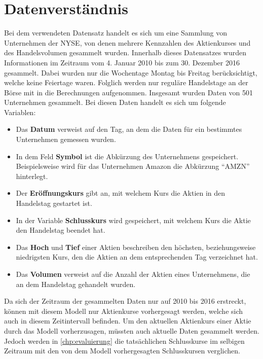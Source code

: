 \chapter{Datenverständnis}\label{chp:datenverstaendnis}
Bei dem verwendeten Datensatz handelt es sich um eine Sammlung von Unternehmen der \ac{NYSE}, von denen mehrere Kennzahlen des Aktienkurses und des Handelsvolumen gesammelt wurden. Innerhalb dieses Datensatzes wurden Informationen im Zeitraum vom 4. Januar 2010 bis zum 30. Dezember 2016 gesammelt. Dabei wurden nur die Wochentage Montag bis Freitag berücksichtigt, welche keine Feiertage waren. Folglich werden nur reguläre Handelstage an der Börse mit in die Berechnungen aufgenommen. Insgesamt wurden Daten von 501 Unternehmen gesammelt. Bei diesen Daten handelt es sich um folgende Variablen:

\begin{itemize}
    \item Das \textbf{Datum} verweist auf den Tag, an dem die Daten für ein bestimmtes Unternehmen gemessen wurden.
    \item In dem Feld \textbf{Symbol} ist die Abkürzung des Unternehmens gespeichert. Beispielsweise wird für das Unternehmen Amazon die Abkürzung ``AMZN'' hinterlegt.
    \item Der \textbf{Eröffnungskurs} gibt an, mit welchem Kurs die Aktien in den Handelstag gestartet ist.
    \item In der Variable \textbf{Schlusskurs} wird gespeichert, mit welchem Kurs die Aktie den Handelstag beendet hat.
    \item Das \textbf{Hoch} und \textbf{Tief} einer Aktien beschreiben den höchsten, beziehungsweise niedrigsten Kurs, den die Aktien an dem entsprechenden Tag verzeichnet hat.
    \item Das \textbf{Volumen} verweist auf die Anzahl der Aktien eines Unternehmens, die an dem Handelstag gehandelt wurden.
\end{itemize}

Da sich der Zeitraum der gesammelten Daten nur auf 2010 bis 2016 erstreckt, können mit diesem Modell nur Aktienkurse vorhergesagt werden, welche sich auch in diesem Zeitintervall befinden. Um den aktuellen Aktienkurs einer Aktie durch das Modell vorherzusagen, müssten auch aktuelle Daten gesammelt werden. Jedoch werden in \cref{chp:evaluierung} die tatsächlichen Schlusskurse im selbigen Zeitraum mit den von dem Modell vorhergesagten Schlusskursen verglichen.
